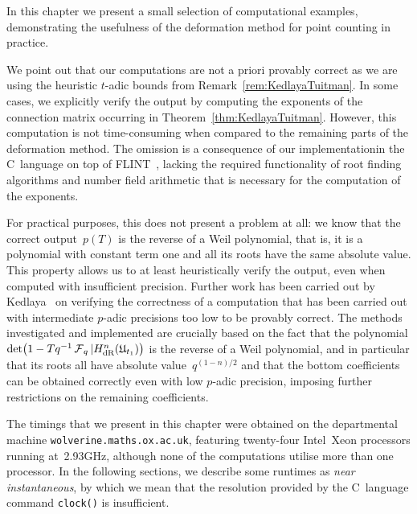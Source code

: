 
In this chapter we present a small selection of computational examples, 
demonstrating the usefulness of the deformation method for point counting 
in practice.

We point out that our computations are not a priori provably 
correct as we are using the heuristic $t$-adic bounds from 
Remark~\ref{rem:KedlayaTuitman}.  In some cases, we explicitly 
verify the output by computing the exponents of the connection 
matrix occurring in Theorem~\ref{thm:KedlayaTuitman}.  However, 
this computation is not time-consuming when compared to the 
remaining parts of the deformation method.  The omission is 
a consequence of our implementation\footnotemark in the C~language 
on top of FLINT~\citep{FLINT}, lacking the required functionality 
of root finding algorithms and number field arithmetic that is 
necessary for the computation of the exponents.  


For practical purposes, this does not present a problem at all:  we know 
that the correct output~$p(T)$ is the reverse of a Weil polynomial, that 
is, it is a polynomial with constant term one and all its roots have 
the same absolute value.  This property allows us to at least 
heuristically verify the output, even when computed with insufficient 
precision.  Further work has been carried out by Kedlaya~\citep{Kedlaya2008} 
on verifying the correctness of a computation that has been carried out 
with intermediate $p$-adic precisions too low to be provably correct. 
The methods investigated and implemented are crucially based on the 
fact that the polynomial 
\mbox{$\det\bigl(1 - T q^{-1} \operatorname{\mathcal{F}}_q | H_{\text{dR}}^{n}(\mathfrak{U}_{t_1})\bigr)$} 
is the reverse of a Weil polynomial, and in particular that its 
roots all have absolute value~$q^{(1-n)/2}$ and that the bottom 
coefficients can be obtained correctly even with low $p$-adic precision, 
imposing further restrictions on the remaining coefficients.

The timings that we present in this chapter were obtained on the 
departmental machine {\tt{wolverine.maths.ox.ac.uk}}, featuring twenty-four 
\mbox{Intel Xeon} processors running at~2.93GHz, although none of the 
computations utilise more than one processor.  In the following sections, 
we describe some runtimes as \emph{near instantaneous}, by which we mean 
that the resolution provided by the C~language command {\tt{clock()}} is 
insufficient.

